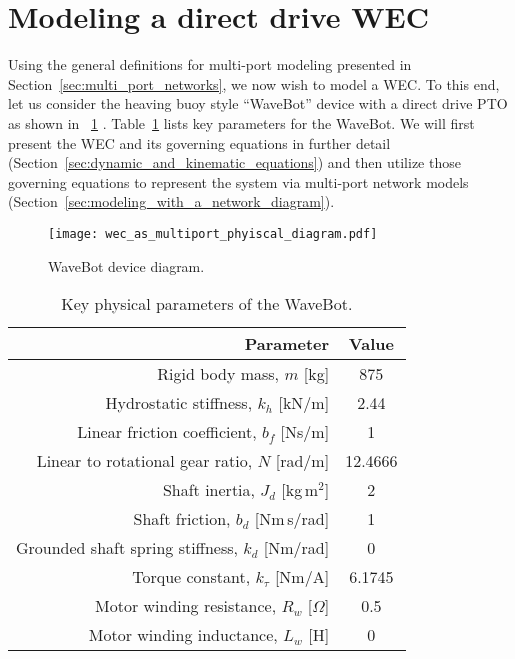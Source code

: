 \documentclass[5p,times]{elsarticle}
\begin{document}
\section{Modeling a direct drive WEC}\label{sec:modeling_a_direct_drive_wec}
Using the general definitions for multi-port modeling presented in Section~\ref{sec:multi_port_networks}, we now wish to model a WEC.
To this end, let us consider the heaving buoy style ``WaveBot'' device with a direct drive PTO as shown in \figurename~\ref{fig:wec_as_multiport_physical_diagram} \cite{Forbush:2024aa}.
Table~\ref{tab:wec_physical_params} lists key parameters for the WaveBot.
We will first present the WEC and its governing equations in further detail (Section~\ref{sec:dynamic_and_kinematic_equations}) and then utilize those governing equations to represent the system via multi-port network models (Section~\ref{sec:modeling_with_a_network_diagram}).

\begin{figure}[tb]
        \centering
        \texttt{[image: wec\_as\_multiport\_phyiscal\_diagram.pdf]}
        \caption{WaveBot device diagram.}
        \label{fig:wec_as_multiport_physical_diagram}
\end{figure}

\begin{table}[tb]
        \caption{Key physical parameters of the WaveBot.}
        \label{tab:wec_physical_params}
        \centering

        \begin{tabular}{rc}
        \hline

        \hline
        \textbf{Parameter} & \textbf{Value} \\
        \hline
        Rigid body mass, $m$ [kg]                       & 875 \\
        Hydrostatic stiffness, $k_h$ [kN/m]             & 2.44 \\
        Linear friction coefficient, $b_f$ [Ns/m]       & 1 \\ %
        Linear to rotational gear ratio, $N$ [rad/m]    & 12.4666 \\
        Shaft inertia, $J_d$ [kg\,m$^2$]                & 2 \\ %
        Shaft friction, $b_d$ [Nm\,s/rad]               & 1 \\ %
        Grounded shaft spring stiffness, $k_d$ [Nm/rad] & 0 \\ %
        Torque constant, $k_\tau$ [Nm/A]                & 6.1745 \\
        Motor winding resistance, $R_w$ [$\Omega$]      & 0.5 \\
        Motor winding inductance, $L_w$ [H]             & 0 \\
        \hline

        \hline
        \end{tabular}
\end{table}
\end{document}
